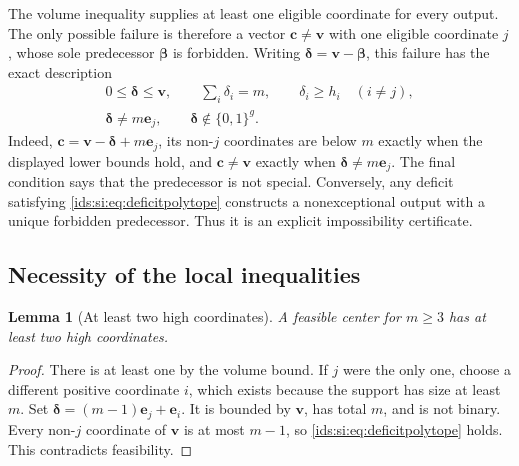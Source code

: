 \documentclass[11pt,letterpaper]{article}
\newtheorem{lemma}[theorem]{Lemma}
\theoremstyle{definition}\newtheorem{definition}[theorem]{Definition}
\theoremstyle{remark}\newtheorem{remark}[theorem]{Remark}
\theoremstyle{definition}\newtheorem{question}[theorem]{Question}
\begin{document}
The volume inequality supplies at least one eligible coordinate for every
output. The only possible failure is therefore a vector $\mathbf c\ne\mathbf v$ with
one eligible coordinate $j$, whose sole predecessor $\boldsymbol\beta$ is forbidden.
Writing $\boldsymbol\delta=\mathbf v-\boldsymbol\beta$, this failure has the exact description
\begin{equation}\label{ids:si:eq:deficitpolytope}
 \begin{gathered}
 0\leq\boldsymbol\delta\leq\mathbf v,\qquad \sum_i\delta_i=m,\qquad
 \delta_i\geq h_i\quad(i\ne j),\\
 \boldsymbol\delta\ne m\mathbf e_j,\qquad \boldsymbol\delta\notin\{0,1\}^g.
 \end{gathered}
\end{equation}
Indeed, $\mathbf c=\mathbf v-\boldsymbol\delta+m\mathbf e_j$, its non-$j$ coordinates are below $m$
exactly when the displayed lower bounds hold, and $\mathbf c\ne\mathbf v$ exactly
when $\boldsymbol\delta\ne m\mathbf e_j$. The final condition says that the predecessor is
not special. Conversely, any deficit satisfying
\eqref{ids:si:eq:deficitpolytope} constructs a nonexceptional output with a unique
forbidden predecessor. Thus it is an explicit impossibility certificate.

\subsection{Necessity of the local inequalities}
\begin{lemma}[At least two high coordinates]\label{ids:si:lem:twohigh}
A feasible center for $m\geq3$ has at least two high coordinates.
\end{lemma}
\begin{proof}
There is at least one by the volume bound. If $j$ were the only one, choose
a different positive coordinate $i$, which exists because the support has
size at least $m$. Set $\boldsymbol\delta=(m-1)\mathbf e_j+\mathbf e_i$. It is bounded by $\mathbf v$,
has total $m$, and is not binary. Every non-$j$ coordinate of $\mathbf v$ is at
most $m-1$, so \eqref{ids:si:eq:deficitpolytope} holds. This contradicts feasibility.
\end{proof}
\end{document}
